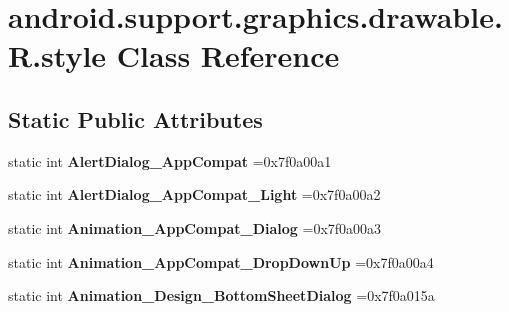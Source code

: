 \hypertarget{classandroid_1_1support_1_1graphics_1_1drawable_1_1R_1_1style}{}\section{android.\+support.\+graphics.\+drawable.\+R.\+style Class Reference}
\label{classandroid_1_1support_1_1graphics_1_1drawable_1_1R_1_1style}
\subsection*{Static Public Attributes}
\begin{DoxyCompactItemize}
\item 
\mbox{\label{classandroid_1_1support_1_1graphics_1_1drawable_1_1R_1_1style_a6cf68bfefbd34bd9fccfb4456e9dea1d}} 
static int {\bfseries Alert\+Dialog\+\_\+\+App\+Compat} =0x7f0a00a1
\item 
\mbox{\label{classandroid_1_1support_1_1graphics_1_1drawable_1_1R_1_1style_af4f27c53d557c91ccb4890c4242b1ccb}} 
static int {\bfseries Alert\+Dialog\+\_\+\+App\+Compat\+\_\+\+Light} =0x7f0a00a2
\item 
\mbox{\label{classandroid_1_1support_1_1graphics_1_1drawable_1_1R_1_1style_ab57621d9fc6cb021bb2be03a38f2a045}} 
static int {\bfseries Animation\+\_\+\+App\+Compat\+\_\+\+Dialog} =0x7f0a00a3
\item 
\mbox{\label{classandroid_1_1support_1_1graphics_1_1drawable_1_1R_1_1style_a8595f0097a3ae079ab139c55dfc4a894}} 
static int {\bfseries Animation\+\_\+\+App\+Compat\+\_\+\+Drop\+Down\+Up} =0x7f0a00a4
\item 
\mbox{\label{classandroid_1_1support_1_1graphics_1_1drawable_1_1R_1_1style_a2f433753bb7fcbc3f874ca278347048a}} 
static int {\bfseries Animation\+\_\+\+Design\+\_\+\+Bottom\+Sheet\+Dialog} =0x7f0a015a
\item 
\mbox{\label{classandroid_1_1support_1_1graphics_1_1drawable_1_1R_1_1style_a2c7c1fc390d2c5e456c9f501d5ab486e}} 

\end{DoxyCompactItemize}
